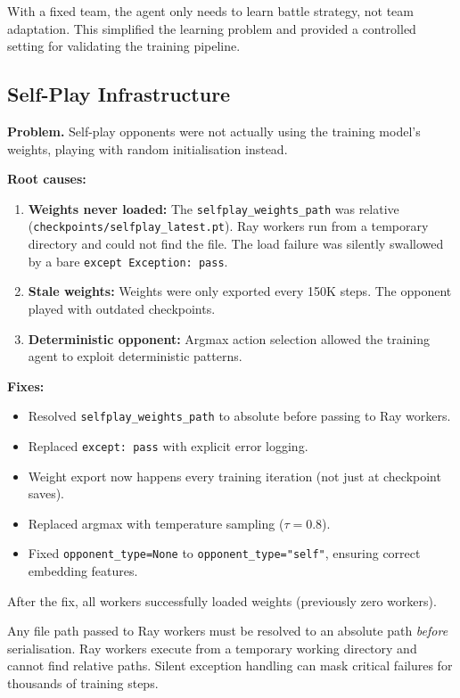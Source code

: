 With a fixed team, the agent only needs to learn battle strategy, not team
adaptation.  This simplified the learning problem and provided a controlled
setting for validating the training pipeline.

\subsection{Self-Play Infrastructure}

\textbf{Problem.} Self-play opponents were not actually using the training
model's weights, playing with random initialisation instead.

\textbf{Root causes:}
\begin{enumerate}
  \item \textbf{Weights never loaded:} The
        \texttt{selfplay\_weights\_path} was relative
        (\texttt{checkpoints/selfplay\_latest.pt}).  Ray workers run from a
        temporary directory and could not find the file.  The load failure was
        silently swallowed by a bare \texttt{except Exception: pass}.
  \item \textbf{Stale weights:} Weights were only exported every 150K steps.
        The opponent played with outdated checkpoints.
  \item \textbf{Deterministic opponent:} Argmax action selection allowed the
        training agent to exploit deterministic patterns.
\end{enumerate}

\textbf{Fixes:}
\begin{itemize}
  \item Resolved \texttt{selfplay\_weights\_path} to absolute before passing
        to Ray workers.
  \item Replaced \texttt{except: pass} with explicit error logging.
  \item Weight export now happens every training iteration (not just at
        checkpoint saves).
  \item Replaced argmax with temperature sampling ($\tau=0.8$).
  \item Fixed \texttt{opponent\_type=None} to
        \texttt{opponent\_type="self"}, ensuring correct embedding features.
\end{itemize}

After the fix, all workers successfully loaded weights (previously zero
workers).

\begin{keyinsight}
Any file path passed to Ray workers must be resolved to an absolute path
\emph{before} serialisation.  Ray workers execute from a temporary working
directory and cannot find relative paths.  Silent exception handling can mask
critical failures for thousands of training steps.
\end{keyinsight}

